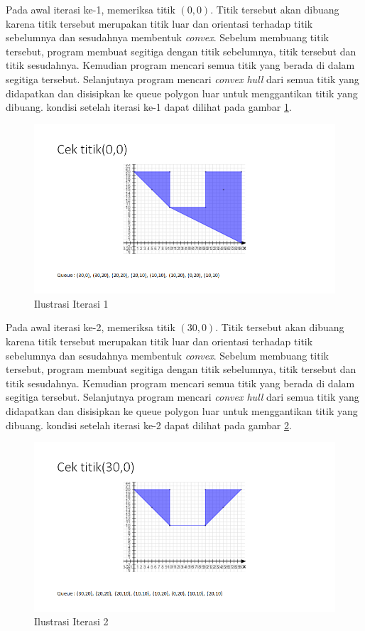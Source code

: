 \par Pada awal iterasi ke-1, memeriksa titik $(0,0)$. Titik tersebut akan dibuang karena titik tersebut merupakan titik luar dan orientasi terhadap titik sebelumnya dan sesudahnya membentuk \textit{convex}. Sebelum membuang titik tersebut, program membuat segitiga dengan titik sebelumnya, titik tersebut dan titik sesudahnya. Kemudian program mencari semua titik yang berada di dalam segitiga tersebut. Selanjutnya program mencari \textit{convex hull} dari semua titik yang didapatkan dan disisipkan ke queue polygon luar untuk menggantikan titik yang dibuang. kondisi setelah iterasi ke-1 dapat dilihat pada gambar \ref{fig:iterasi-1}.
\begin{figure}[!h]
	\Centering
	\includegraphics [width=\columnwidth]{bab5/img/iterasi-1}
	\caption {Ilustrasi Iterasi 1}
	\label {fig:iterasi-1}
\end{figure}

\par Pada awal iterasi ke-2, memeriksa titik $(30,0)$. Titik tersebut akan dibuang karena titik tersebut merupakan titik luar dan orientasi terhadap titik sebelumnya dan sesudahnya membentuk \textit{convex}. Sebelum membuang titik tersebut, program membuat segitiga dengan titik sebelumnya, titik tersebut dan titik sesudahnya. Kemudian program mencari semua titik yang berada di dalam segitiga tersebut. Selanjutnya program mencari \textit{convex hull} dari semua titik yang didapatkan dan disisipkan ke queue polygon luar untuk menggantikan titik yang dibuang. kondisi setelah iterasi ke-2 dapat dilihat pada gambar \ref{fig:iterasi-2}.
\begin{figure}[!h]
	\Centering
	\includegraphics [width=\columnwidth]{bab5/img/iterasi-2}
	\caption {Ilustrasi Iterasi 2}
	\label {fig:iterasi-2}
\end{figure}

